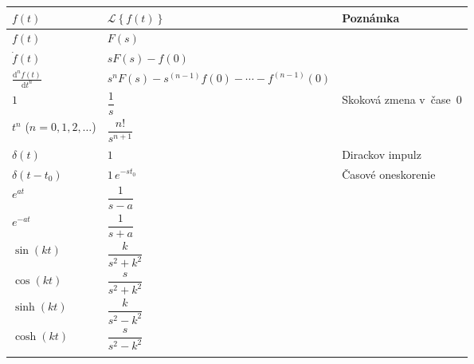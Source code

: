 \documentclass[a4paper, 10pt, ]{article}
\begin{document}
\newcommand{\Laplace}[1]{\ensuremath{\mathcal{L}{\left\{#1\right\}}}}
\newcommand{\InvLap}[1]{\ensuremath{\mathcal{L}^{-1}{\left\{#1\right\}}}}


\noindent
\begin{longtable}[l]{p{3.7cm} @{} p{5.9cm} p{2.8cm}}

    \toprule
    $f(t)$                                  & $\Laplace{f(t)}$   & {\color{Gray} \scriptsize Poznámka} \\
    \midrule
    \addlinespace[5mm]
    \endhead



    $f(t)$                                  & $F(s)$                                \\[4mm]
    $\dot f(t)$                             & $sF(s) - f(0)$                        \\[4mm]
    $\displaystyle \frac{\text{d}^n f(t)}{\text{d}t^n}$                                 & $s^nF(s) - s^{(n-1)} f(0) - \cdots - f^{(n-1)}(0)$ \\[4mm]    
    \midrule \addlinespace[4mm]


    $1$                                     & $\dfrac{1}{s}$                        & {\color{Gray} \scriptsize Skoková zmena v~čase~$0$}  \\[4mm]
    $t^n$ ($n=0,1,2,\dots$)                 & $\dfrac{n!}{s^{n+1}}$                 \\[4mm]
    \midrule \addlinespace[4mm]


    $\delta(t)$                             & $1$                                   & {\color{Gray} \scriptsize Dirackov impulz} \\[4mm]
    $\delta(t-t_0)$                         & $1 \, e^{-st_0}$                      & {\color{Gray} \scriptsize Časové oneskorenie} \\[4mm]
    \midrule \addlinespace[4mm]
        
    
    $e^{at}$                                & $\dfrac{1}{s-a}$                      \\[4mm]
    $e^{-at}$                                & $\dfrac{1}{s+a}$                     \\[4mm]
    \midrule \addlinespace[4mm]


    $\sin(kt)$                               & $\dfrac{k}{s^2+k^2}$                  \\[4mm]
    $\cos(kt)$                               & $\dfrac{s}{s^2+k^2}$                  \\[4mm]
    $\sinh(kt)$                              & $\dfrac{k}{s^2-k^2}$                  \\[4mm]
    $\cosh(kt)$                              & $\dfrac{s}{s^2-k^2}$                  \\[4mm]
    \midrule \addlinespace[4mm]



\end{longtable}
\end{document}
